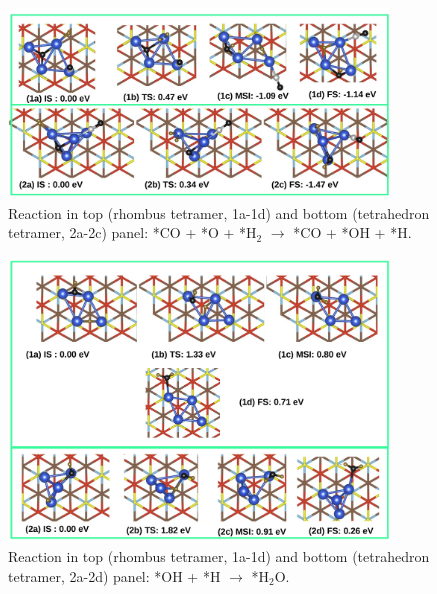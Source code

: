 \begin{figure}
  \begin{center}
    \includegraphics[width=0.9\textwidth]{./Appendix3/figures_si/p_104.jpg}
  \end{center}
    \caption{Reaction in top (rhombus tetramer, 1a-1d) and bottom (tetrahedron tetramer, 2a-2c) panel: *CO + *O + *H$_2$ $\rightarrow$ *CO + *OH + *H.   }
  \label{fig:si-104}
\end{figure}

\begin{figure}
  \begin{center}
    \includegraphics[width=0.9\textwidth]{./Appendix3/figures_si/p_105.jpg}
  \end{center}
    \caption{Reaction in top (rhombus tetramer, 1a-1d) and bottom (tetrahedron tetramer, 2a-2d) panel: *OH + *H $\rightarrow$ *H$_2$O.   }
  \label{fig:si-105}
\end{figure}

